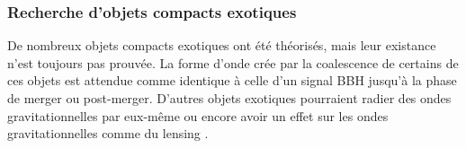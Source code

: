 \subsubsection*{Recherche d'objets compacts exotiques}
\label{sec:exotic}
De nombreux objets compacts exotiques ont été théorisés, mais leur existance n'est toujours pas prouvée.
La forme d'onde crée par la coalescence de certains de ces objets est attendue comme identique à celle d'un signal BBH jusqu'à la phase de merger ou post-merger.
D'autres objets exotiques pourraient radier des ondes gravitationnelles par eux-même ou encore avoir un effet sur les ondes gravitationnelles comme du lensing \cite{ECO1,ECO2}.



